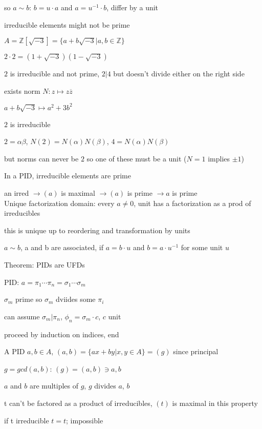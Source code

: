 \documentclass[12pt]{article}
\begin{document}
so $a \sim b$: $b = u \cdot a$ and $a = u^{-1} \cdot b$, differ by a unit

\noindent
irreducible elements might not be prime

$A = \mathds{Z}[\sqrt{-3}] = \{a + b\sqrt{-3} | a, b \in \mathds{Z}\}$

$2 \cdot 2 = (1 + \sqrt{-3})(1 - \sqrt{-3})$

$2$ is irreducible and not prime, $2 | 4$ but doesn't divide either on the right side

exists norm $N: z \mapsto z\overline{z}$

$a + b\sqrt{-3} \mapsto a^2 + 3b^2$

$2$ is irreducible

$2 = \alpha\beta$, $N(2) = N(\alpha)N(\beta)$, $4 = N(\alpha)N(\beta)$

but norms can never be $2$ so one of these must be a unit ($N = 1$ implies $\pm 1$)

\noindent
In a PID, irreducible elements are prime

an irred $\to (a)$ is maximal $\to (a)$ is prime $\to a$ is prime\\

\noindent
Unique factorization domain: every $a \neq 0$, unit has a factorization as a prod of irreducibles

this is unique up to reordering and transformation by units

$a \sim b$, a and b are associated, if $a = b \cdot u$ and $b = a \cdot u^{-1}$ for some unit $u$

\noindent
Theorem: PIDs are UFDs

PID: $a = \pi_1 \cdots \pi_n = \sigma_1 \cdots \sigma_m$

$\sigma_m$ prime so $\sigma_m$ dviides some $\pi_i$

can assume $\sigma_m | \pi_n$, $\phi_n = \sigma_m \cdot c$, $c$ unit

proceed by induction on indices, end

\noindent
A PID $a, b \in A$, $(a, b) = \{ax + by | x, y \in A\} = (g)$ since principal

$g = gcd(a, b)$: $(g) = (a, b) \ni a, b$

$a$ and $b$ are multiples of $g$, $g$ divides $a$, $b$

\noindent
t can't be factored as a product of irreducibles, $(t)$ is maximal in this property

\noindent
if t irreducible $t = t$; impossible
\end{document}
